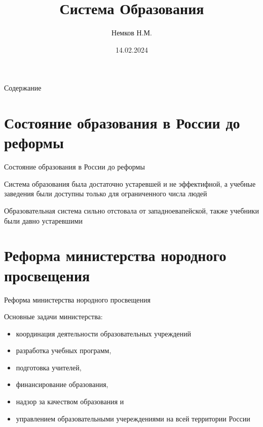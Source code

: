 

\title{Система Образования}
\author{Немков Н.М.}
\date{14.02.2024}



\begin{frame}
\maketitle
\end{frame}

\begin{frame}{Содержание}
\tableofcontents
\end{frame}
\section{Состояние образования в России до реформы}
\begin{frame}{Состояние образования в России до реформы}

\Large{
	Система образования была достаточно устаревшей и не эффектифной, а учебные заведения были доступны только для ограниченного числа людей

	Образовательная система сильно отстовала от западноевапейской, также учебники были давно устаревшими
}

\end{frame}

\section{Реформа министерства нородного просвещения}
\begin{frame}{Реформа министерства нородного просвещения}

	Основные задачи министерства:
	\begin{itemize}

	\item координация деятельности образовательных учреждений

	\item разработка учебных программ,

	\item подготовка учителей,

	\item финансирование образования,

	\item надзор за качеством образования и

	\item управлением образовательными учереждениями на всей территории России
	\end{itemize}
\end{frame}

